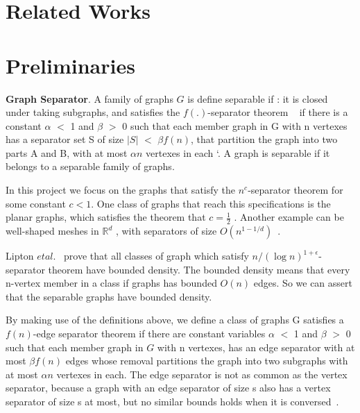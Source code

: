 \documentclass[12pt,glossary]{dalthesis}
\begin{document}
\section{Related Works}


\section{Preliminaries}

\textbf{Graph Separator}. A family of graphs $G$ is define separable if : it is closed under taking subgraphs, and satisfies the $f(.)$-separator theorem ~\cite{separator-theorem} if there is a constant $\alpha$ $<$ 1 and $\beta$ $>$ 0 such that each member graph in G with n vertexes has a separator set S of size $|S|$ $<$ $\beta f(n)$, that partition the graph into two parts A and B, with at most $\alpha n$ vertexes in each `\cite{separator-theorem}. A graph is separable if it belongs to a separable family of graphs. 

\bigskip
\bigskip

In this project we focus on the graphs that satisfy the $n^{c}$-separator theorem for some constant $c < 1$. One class of graphs that reach this specifications is the planar graphs, which satisfies the theorem that $c = \frac{1}{2}$ . Another example can be well-shaped meshes in $\mathbb{R}^{d}$ , with separators of size $O(n^{1-1/d})$~\cite{ separators-sphere-packing}.

\bigskip
\bigskip

Lipton $et al$.~\cite{Nested-Dissection} prove that all classes of graph which satisfy $n/(\log n )^{1+\epsilon}$-separator theorem have bounded density. The bounded density means that every n-vertex member in a class if graphs has bounded $O(n)$ edges. So we can assert that the separable graphs have bounded density.

\bigskip
\bigskip

By making use of the definitions above, we define a class of graphs G satisfies a $f(n)$-edge separator theorem if there are constant variables $\alpha$ $<$ 1 and $\beta$ $>$ 0 such that each member graph in $G$ with n vertexes, has an edge separator with at most $\beta f(n)$ edges whose removal partitions the graph into two subgraphs with at most $\alpha n$ vertexes in each. The edge separator is not as common as the vertex separator, because a graph with an edge separator of size s also has a vertex separator of size s at most, but no similar bounds holds when it is conversed~\cite{compact-representation}.
\end{document}
